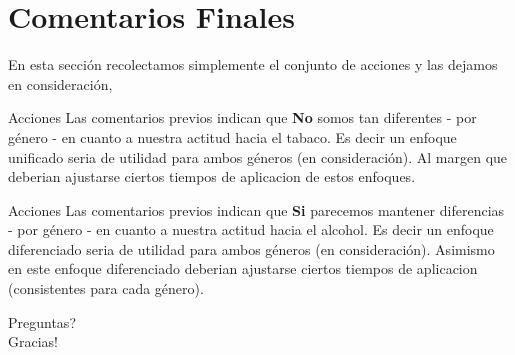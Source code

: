 \documentclass[8pt]{beamer}
\begin{document}
\section{Comentarios Finales}
\begin{frame}
En esta sección recolectamos simplemente el conjunto de acciones y las dejamos en consideración,
\pause
\begin{alertblock}{Acciones}
Las comentarios previos indican que \textbf{No} somos tan diferentes - por género - en cuanto a nuestra actitud hacia el tabaco. Es decir
un enfoque unificado seria de utilidad para ambos géneros (en consideración).  Al margen que deberian ajustarse ciertos tiempos de aplicacion de estos enfoques.
\end{alertblock}  

\pause
\begin{alertblock}{Acciones}
Las comentarios previos indican que \textbf{Si} parecemos mantener diferencias - por género - en cuanto a nuestra actitud hacia el alcohol. Es decir
un enfoque diferenciado seria de utilidad para ambos géneros (en consideración). Asimismo en este enfoque diferenciado deberian ajustarse ciertos tiempos de aplicacion (consistentes para cada género).
\end{alertblock} 

\end{frame}

\begin{frame}
\begin{center}
\huge{Preguntas?}\\ [1cm]
\Large{Gracias!}
\end{center}
\end{frame}
\end{document}
